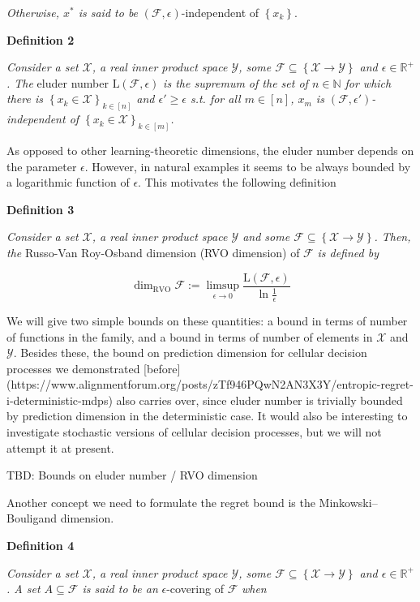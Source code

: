 \documentclass[a4paper]{article}
\newcommand{\Co}[1]{}
\newcommand{\AP}[1]{\left(#1\right)}
\newcommand{\AC}[1]{\left\{#1\right\}}
\newcommand{\Nats}{\mathbb{N}}
\newcommand{\Reals}{\mathbb{R}}
\newcommand{\X}{\mathcal{X}}
\newcommand{\Y}{\mathcal{Y}}
\newcommand{\F}{\mathcal{F}}
\newcommand{\El}{\mathrm{L}}
\newcommand{\RVO}{\dim_{\text{RVO}}}
\begin{document}
\textit{Otherwise, $x^*$ is said to be}\Co{i} $\AP{\F,\epsilon}$-independent of $\AC{x_k}$.

\textbf{Definition 2}\Co{b}

\textit{Consider a set $\X$, a real inner product space $\Y$, some $\F\subseteq\AC{\X\rightarrow\Y}$ and $\epsilon\in\Reals^+$. The}\Co{i} eluder number $\El(\F,\epsilon)$ \textit{is the supremum of the set of $n\in\Nats$ for which there is $\AC{x_k\in\X}_{k\in[n]}$ and $\epsilon'\geq\epsilon$ s.t. for all $m\in[n]$, $x_m$ is $\AP{\F,\epsilon'}$-independent of $\AC{x_k\in\X}_{k\in[m]}$.}\Co{i}


As opposed to other learning-theoretic dimensions, the eluder number depends on the parameter $\epsilon$. However, in natural examples it seems to be always bounded by a logarithmic function of $\epsilon$. This motivates the following definition

\textbf{Definition 3}\Co{b}

\textit{Consider a set $\X$, a real inner product space $\Y$ and some $\F\subseteq\AC{\X\rightarrow\Y}$. Then, the}\Co{i} Russo-Van Roy-Osband dimension (RVO dimension) of $\F$ \textit{is defined by}\Co{i}

$$\RVO{\F}:=\limsup_{\epsilon \rightarrow 0}{\frac{\El(\F,\epsilon)}{\ln\frac{1}{\epsilon}}}$$

We will give two simple bounds on these quantities: a bound in terms of number of functions in the family, and a bound in terms of number of elements in $\X$ and $\Y$. Besides these, the bound on prediction dimension for cellular decision processes we demonstrated [before](https://www.alignmentforum.org/posts/zTf946PQwN2AN3X3Y/entropic-regret-i-deterministic-mdps) also carries over, since eluder number is trivially bounded by prediction dimension in the deterministic case. It would also be interesting to investigate stochastic versions of cellular decision processes, but we will not attempt it at present.

TBD: Bounds on eluder number / RVO dimension

Another concept we need to formulate the regret bound is the Minkowski–Bouligand dimension.

\textbf{Definition 4}\Co{b}

\textit{Consider a set $\X$, a real inner product space $\Y$, some $\F\subseteq\AC{\X\rightarrow\Y}$ and $\epsilon\in\Reals^+$. A set $A\subseteq\F$ is said to be an}\Co{i} $\epsilon$-covering of $\F$ \textit{when}\Co{i}
\end{document}
